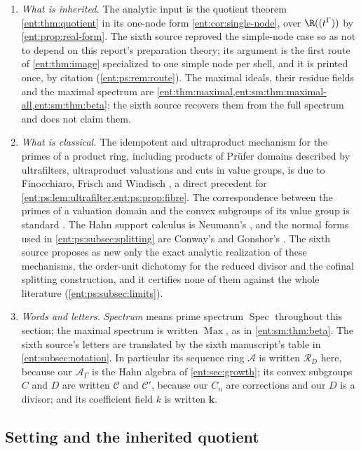 \documentclass[11pt]{article}
\theoremstyle{plain}
\theoremstyle{plain}
\theoremstyle{plain}
\theoremstyle{definition}
\theoremstyle{definition}
\theoremstyle{definition}
\theoremstyle{definition}
\theoremstyle{remark}
\newcommand{\A}{\mathcal A_\Gamma}\newcommand{\OO}{\mathcal O_\Gamma}
\DeclareMathOperator{\Spec}{Spec}\DeclareMathOperator{\red}{red}
\newcommand{\RD}{\mathcal R_D}\newcommand{\Ucal}{\mathcal U}
\newcommand{\kk}{\mathbf k}\newcommand{\PP}{\mathbb P}
\begin{document}
\begin{enumerate}[label=(\arabic*),leftmargin=2em]
\item \emph{What is inherited.} The analytic input is the quotient theorem
\cref{ent:thm:quotient} in its one-node form \cref{ent:cor:single-node}, over
$\R((t^\Gamma))$ by \cref{ent:prop:real-form}. The sixth source reproved the
simple-node case so as not to depend on this report's preparation theory; its
argument is the first route of \cref{ent:thm:image} specialized to one simple
node per shell, and it is printed once, by citation
(\cref{ent:ps:rem:route}). The maximal ideals, their residue fields and the
maximal spectrum are \cref{ent:thm:maximal,ent:sm:thm:maximal-all,ent:sm:thm:beta};
the sixth source recovers them from the full spectrum and does not claim them.
\item \emph{What is classical.} The idempotent and ultraproduct mechanism for
the primes of a product ring, including products of Pr\"ufer domains described
by ultrafilters, ultraproduct valuations and cuts in value groups, is due to
Finocchiaro, Frisch and Windisch \cite{FFW}, a direct precedent for
\cref{ent:ps:lem:ultrafilter,ent:ps:prop:fibre}. The correspondence between
the primes of a valuation domain and the convex subgroups of its value group
is standard \cite{StacksValuation}. The Hahn support calculus is Neumann's
\cite{Neumann}, and the normal forms used in \cref{ent:ps:subsec:splitting}
are Conway's and Gonshor's \cite{Conway,Gonshor}. The sixth source proposes
as new only the exact analytic realization of these mechanisms, the
order-unit dichotomy for the reduced divisor and the cofinal splitting
construction, and it certifies none of them against the whole literature
(\cref{ent:ps:subsec:limits}).
\item \emph{Words and letters.} \emph{Spectrum} means prime spectrum
$\Spec$ throughout this section; the maximal spectrum is written
$\operatorname{Max}$, as in \cref{ent:sm:thm:beta}. The sixth source's
letters are translated by the sixth manuscript's table in
\cref{ent:subsec:notation}. In
particular its sequence ring $\mathcal A$ is written $\RD$ here, because our
$\A$ is the Hahn algebra of \cref{ent:sec:growth}; its convex subgroups $C$
and $D$ are written $\mathcal C$ and $\mathcal C'$, because our $C_n$ are
corrections and our $D$ is a divisor; and its coefficient field $k$ is
written $\kk$.
\end{enumerate}

\subsection{Setting and the inherited quotient}
\label{ent:ps:subsec:setting}
\end{document}
